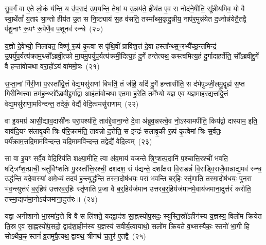 {\anuvakamend[{अ॒सि॒ष्य॒तीति॑ जुहु॒याथ्सा॒यं प्रा॑तरुप॒सद॒श्चतु॑र्विꣳशतिः॒ सञ्च॒तुरो\-ऽग्रे॒ षोड॑श च}]}%

सु॒व॒र्गं वा ए॒ते लो॒कं य॑न्ति॒ य उ॑प॒सद॑ उप॒यन्ति॒ तेषां॒ य उ॒न्नय॑ते॒ हीय॑त ए॒व स नोद॑ने॒षीति॒ सू᳚न्नीयमिव॒ यो वै स्वा॒र्थेतां᳚ य॒ताꣴ श्रा॒न्तो हीय॑त उ॒त स नि॒ष्ट्याय॑ स॒ह व॑सति॒ तस्मा᳚थ्स॒कृदु॒न्नीय॒ नाप॑र॒मुन्न॑येत द॒ध्नोन्न॑येतै॒तद्वै प॑शू॒नाꣳ रू॒पꣳ रू॒पेणै॒व प॒शूनव॑ रुन्धे~(२०)

य॒ज्ञो दे॒वेभ्यो॒ निला॑यत॒ विष्णू॑ रू॒पं कृ॒त्वा स पृ॑थि॒वीं प्रावि॑श॒त्तं दे॒वा हस्ता᳚न्थ्स॒ꣳ॒रभ्यै᳚च्छ॒न्तमिन्द्र॑ उ॒पर्यु॑प॒र्यत्य॑क्राम॒थ्सो᳚\-ऽब्रवी॒त्को मा॒यमु॒पर्यु॑प॒र्यत्य॑क्रमी॒दित्य॒हं दु॒र्गे हन्तेत्यथ॒ कस्त्वमित्य॒हं दु॒र्गादाह॒र्तेति॒ सो᳚\-ऽब्रवीद्दु॒र्गे वै हन्ता॑वोचथा वरा॒हो॑\-ऽयं वा॑ममो॒षः~(२१)

स॒प्ता॒नां गि॑री॒णां प॒रस्ता᳚द्वि॒त्तं वेद्य॒मसु॑राणां बिभर्ति॒ तं ज॑हि॒ यदि॑ दु॒र्गे हन्तासीति॒ स द॑र्भपुञ्जी॒लमु॒द्वृह्य॑ स॒प्त गि॒रीन्भि॒त्त्वा तम॑ह॒न्थ्सो᳚\-ऽब्रवीद्दु॒र्गाद्वा आह॑र्तावोचथा ए॒तमा ह॒रेति॒ तमे᳚भ्यो य॒ज्ञ ए॒व य॒ज्ञमाह॑र॒द्यत्तद्वि॒त्तं वेद्य॒मसु॑राणा॒मवि॑न्दन्त॒ तदेकं॒ वेद्यै॑ वेदि॒त्वमसु॑राणाम्~(२२)

वा इ॒यमग्र॑ आसी॒द्याव॒दासी॑नः परा॒पश्य॑ति॒ ताव॑द्दे॒वाना॒न्ते दे॒वा अ॑ब्रुव॒न्नस्त्वे॒व नो॒\-ऽस्यामपीति॒ किय॑द्वो दास्याम॒ इति॒ याव॑दि॒यꣳ स॑लावृ॒की त्रिः प॑रि॒क्राम॑ति॒ ताव॑न्नो द॒त्तेति॒ स इन्द्रः॑ सलावृ॒की रू॒पं कृ॒त्वेमां त्रिः स॒र्वतः॒ पर्य॑क्राम॒त्तदि॒माम॑विन्दन्त॒ यदि॒मामवि॑न्दन्त॒ तद्वेद्यै॑ वेदि॒त्वम्~(२३)

सा वा इ॒यꣳ सर्वै॒व वेदि॒रिय॑ति शक्ष्या॒मीति॒ त्वा अ॑व॒माय॑ यजन्ते त्रि॒ꣳ॒शत्प॒दानि॑ प॒श्चात्ति॒रश्ची॑ भवति॒ षट्त्रिꣳ॑श॒त्प्राची॒ चतु॑र्विꣳशतिः पु॒रस्ता᳚त्ति॒रश्ची॒ दश॑दश॒ सं प॑द्यन्ते॒ दशा᳚क्षरा वि॒राडन्नं॑ वि॒राड्वि॒राजै॒वान्नाद्य॒मव॑ रुन्ध॒ उद्ध॑न्ति॒ यदे॒वास्या॑ अमे॒ध्यं तदप॑ ह॒न्त्युद्ध॑न्ति॒ तस्मा॒दोष॑धयः॒ परा॑ भवन्ति ब॒र्॒\mbox{}हिः स्तृ॑णाति॒ तस्मा॒दोष॑धयः॒ पुन॒रा भ॑व॒न्त्युत्त॑रं ब॒र्॒\mbox{}हिष॑ उत्तरब॒र्॒\mbox{}हिः स्तृ॑णाति प्र॒जा वै ब॒र्॒\mbox{}हिर्यज॑मान उत्तरब॒र्॒\mbox{}हिर्यज॑मानमे॒वाय॑जमाना॒दुत्त॑रं करोति॒ तस्मा॒द्यज॑मा॒नो\-ऽय॑जमाना॒दुत्त॑रः॥~(२४)

{}%

यद्वा अनी॑शानो भा॒रमा॑द॒त्ते वि वै स लि॑शते॒ यद्द्वाद॑श सा॒ह्नस्यो॑प॒सदः॒ स्युस्ति॒स्रो॑\-ऽहीन॑स्य य॒ज्ञस्य॒ विलो॑म क्रियेत ति॒स्र ए॒व सा॒ह्नस्यो॑प॒सदो॒ द्वाद॑शा॒हीन॑स्य य॒ज्ञस्य॑ सवीर्य॒त्वायाथो॒ सलो॑म क्रियते व॒थ्सस्यैकः॒ स्तनो॑ भा॒गी हि सो\-ऽथैक॒ꣴ॒ स्तनं॑ व्र॒तमुपै॒त्यथ॒ द्वावथ॒ त्रीनथ॑ च॒तुर॑ ए॒तद्वै~(२५)


